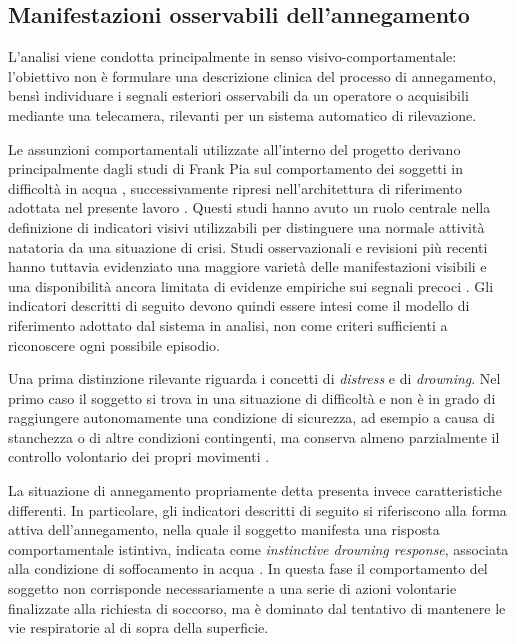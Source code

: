 \subsection{Manifestazioni osservabili dell'annegamento}

L'analisi viene condotta principalmente in senso visivo-comportamentale: l'obiettivo non è formulare una descrizione clinica del processo di annegamento, bensì individuare i segnali esteriori osservabili da un operatore o acquisibili mediante una telecamera, rilevanti per un sistema automatico di rilevazione.

Le assunzioni comportamentali utilizzate all'interno del progetto derivano principalmente dagli studi di Frank Pia sul comportamento dei soggetti in difficoltà in acqua \cite{Pia1974Observation,Pia1999Reflections}, successivamente ripresi nell'architettura di riferimento adottata nel presente lavoro \cite{Kam2002Drowning,Eng2008DEWS}. Questi studi hanno avuto un ruolo centrale nella definizione di indicatori visivi utilizzabili per distinguere una normale attività natatoria da una situazione di crisi. Studi osservazionali e revisioni più recenti hanno tuttavia evidenziato una maggiore varietà delle manifestazioni visibili e una disponibilità ancora limitata di evidenze empiriche sui segnali precoci \cite{CarballoFazanes2020VisibleBehaviour,PascualGomez2022Recognition}. Gli indicatori descritti di seguito devono quindi essere intesi come il modello di riferimento adottato dal sistema in analisi, non come criteri sufficienti a riconoscere ogni possibile episodio.

Una prima distinzione rilevante riguarda i concetti di \emph{distress} e di \emph{drowning}. Nel primo caso il soggetto si trova in una situazione di difficoltà e non è in grado di raggiungere autonomamente una condizione di sicurezza, ad esempio a causa di stanchezza o di altre condizioni contingenti, ma conserva almeno parzialmente il controllo volontario dei propri movimenti \cite{Pia1999Reflections,Kam2002Drowning}.

La situazione di annegamento propriamente detta presenta invece caratteristiche differenti. In particolare, gli indicatori descritti di seguito si riferiscono alla forma attiva dell'annegamento, nella quale il soggetto manifesta una risposta comportamentale istintiva, indicata come \emph{instinctive drowning response}, associata alla condizione di soffocamento in acqua \cite{Pia1974Observation,Pia1999Reflections,Eng2008DEWS}. In questa fase il comportamento del soggetto non corrisponde necessariamente a una serie di azioni volontarie finalizzate alla richiesta di soccorso, ma è dominato dal tentativo di mantenere le vie respiratorie al di sopra della superficie.

